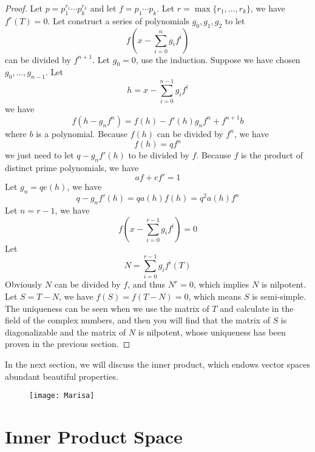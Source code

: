 \documentclass{article}
\begin{document}
\begin{proof}
	Let $p=p_1^{r_1}\cdots p_k^{r_k}$ and let $f=p_1\cdots p_k$. Let $r=\max\{r_1,\dots,r_k\}$, we have $f^r(T)=0$. Let construct a series of polynomials $g_0,g_1,g_2$ to let
	\[f(x-\sum_{i=0}^ng_if^i)\]
	can be divided by $f^{n+1}$. Let $g_0=0$, use the induction. Suppose we have chosen $g_0,\dots,g_{n-1}$. Let
	\[h=x-\sum_{i=0}^{n-1}g_if^i\]
	we have
	\[f(h-g_nf^n)=f(h)-f'(h)g_nf^n+f^{n+1}b\]
	where $b$ is a polynomial. Because $f(h)$ can be divided by $f^n$, we have
	\[f(h)=qf^n\]
	we just need to let $q-g_nf'(h)$ to be divided by $f$. Because $f$ is the product of distinct prime polynomials, we have
	\[af+ef'=1\]
	Let $g_n=qe(h)$, we have
	\[q-g_nf'(h)=qa(h)f(h)=q^2a(h)f^n\]
	Let $n=r-1$, we have
	\[f(x-\sum_{i=0}^{r-1}g_if^i)=0\]
	Let
	\[N=\sum_{i=0}^{r-1}g_if^i(T)\]
	Obviously $N$ can be divided by $f$, and thus $N^r=0$, which implies $N$ is nilpotent. Let $S=T-N$, we have $f(S)=f(T-N)=0$, which means $S$ is semi-simple. The uniqueness can be seen when we use the matrix of $T$ and calculate in the field of the complex numbers, and then you will find that the matrix of $S$ is diagonalizable and the matrix of $N$ is nilpotent, whose uniqueness has been proven in the previous section.
\end{proof}
In the next section, we will discuss the inner product, which endows vector spaces abundant beautiful properties.
\newpage
\begin{figure}[H]
	\centering
	\texttt{[image: Marisa]}
\end{figure}
\thispagestyle{empty}
\newpage
\section{Inner Product Space}
\end{document}
